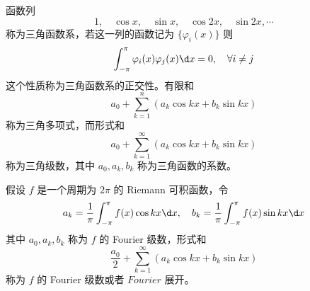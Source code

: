 函数列
\[ 1, \quad \cos x, \quad \sin x, \quad \cos 2x, \quad \sin 2x , \cdots \]
称为三角函数系，若这一列的函数记为 $\{\varphi_i(x)\}$ 则
\[ \int_{-\pi}^{\pi} \varphi_i(x) \varphi_j(x) \d x = 0, \quad \forall i \neq j \]
这个性质称为三角函数系的正交性。有限和
\[ a_0 + \sum_{k=1}^n (a_k \cos kx + b_k \sin kx) \]
称为三角多项式，而形式和
\[ a_0 + \sum_{k=1}^\infty (a_k \cos kx + b_k \sin kx) \]
称为三角级数，其中 $a_0, a_k, b_k$ 称为三角函数的系数。

\begin{definition}
	假设 $f$ 是一个周期为 $2\pi$ 的 Riemann 可积函数，令
	\[ a_k = \frac{1}{\pi} \int_{-\pi}^{\pi} f(x) \cos kx \d x, \quad b_k = \frac{1}{\pi} \int_{-\pi}^{\pi} f(x) \sin k x \d x \]
	其中 $a_0, a_k, b_k$ 称为 $f$ 的 Fourier 级数，形式和
	\[ \frac{a_0}{2} + \sum_{k=1}^\infty (a_k \cos k x+ b_k \sin k x) \]
	称为 $f$ 的 Fourier 级数或者 $Fourier$ 展开。
\end{definition}

